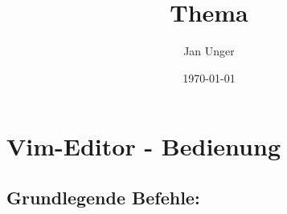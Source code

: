 \documentclass{vorlage-design-main}
\title{Thema}
\author{Jan Unger}
\date{\today}
\begin{document}
\maketitle

\begin{abstract}

\end{abstract}

\hypertarget{vim-editor---bedienung}{%
\section{Vim-Editor - Bedienung}\label{vim-editor---bedienung}}

\hypertarget{grundlegende-befehle}{%
\subsection{Grundlegende Befehle:}\label{grundlegende-befehle}}
\end{document}

